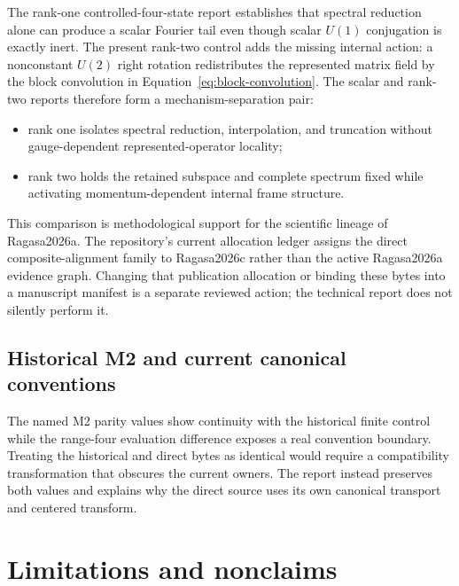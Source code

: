 \documentclass[11pt]{article}
\begin{document}
The rank-one controlled-four-state report establishes that spectral reduction alone can
produce a scalar Fourier tail even though scalar $U(1)$ conjugation is exactly inert.
The present rank-two control adds the missing internal action: a nonconstant $U(2)$
right rotation redistributes the represented matrix field by the block convolution in
Equation~\eqref{eq:block-convolution}.  The scalar and rank-two reports therefore form a
mechanism-separation pair:
\begin{itemize}
 \item rank one isolates spectral reduction, interpolation, and truncation without
       gauge-dependent represented-operator locality;
 \item rank two holds the retained subspace and complete spectrum fixed while activating
       momentum-dependent internal frame structure.
\end{itemize}
This comparison is methodological support for the scientific lineage of Ragasa2026a.
The repository's current allocation ledger assigns the direct composite-alignment family
to Ragasa2026c rather than the active Ragasa2026a evidence graph.  Changing that
publication allocation or binding these bytes into a manuscript manifest is a separate
reviewed action; the technical report does not silently perform it.

\subsection{Historical M2 and current canonical conventions}

The named M2 parity values show continuity with the historical finite control while the
range-four evaluation difference exposes a real convention boundary.  Treating the
historical and direct bytes as identical would require a compatibility transformation
that obscures the current owners.  The report instead preserves both values and explains
why the direct source uses its own canonical transport and centered transform.

\section{Limitations and nonclaims}
\end{document}
